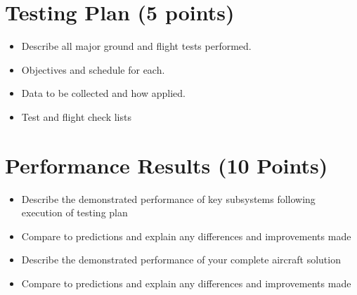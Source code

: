 \documentclass[journal]{byu-aero}
\begin{document}
\section{Testing Plan (5 points)}
\label{sec:TestingPlan}
\begin{itemize}
\item Describe all major ground and flight tests performed.
\item Objectives and schedule for each.
\item Data to be collected and how applied.
\item Test and flight check lists
\end{itemize}

\section{Performance Results (10 Points)}
\label{sec:PerformanceResults}
\begin{itemize}
\item Describe the demonstrated performance of key subsystems following execution of testing plan
\item Compare to predictions and explain any differences and improvements made
\item Describe the demonstrated performance of your complete aircraft solution
\item Compare to predictions and explain any differences and improvements made
\end{itemize}



{}


\appendix

\end{document}
